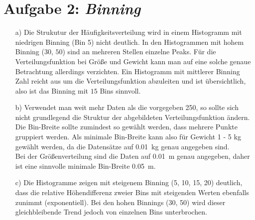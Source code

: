 \section*{Aufgabe 2: \emph{Binning}}
\begin{itemize} 
\item[a)] Die Strukutur der Häufigkeitsverteilung wird in einem Histogramm mit niedrigen 
Binning (Bin 5) nicht deutlich. 
In den Histogrammen mit hohem Binning ($30$, $50$) sind an mehreren Stellen einzelne Peaks.
Für die Verteilungsfunktion bei Größe und Gewicht kann man auf eine solche
genaue Betrachtung allerdings verzichten.
Ein Histogramm mit mittlerer Binning Zahl reicht aus um die Verteilungsfunktion abzuleiten und ist übersichtlich, also ist das Binning mit $15$ Bins sinnvoll.

\item[b)] Verwendet man weit mehr Daten als die vorgegeben 250, so sollte sich nicht grundlegend die
Struktur der abgebildeten Verteilungsfunktion ändern.
Die Bin-Breite sollte zumindest so gewählt werden, dass mehrere Punkte gruppiert werden. Als minimale Bin-Breite kann also für Gewicht 1 - 5 kg gewählt werden, da die Datensätze auf \SI{0.01}{\kilogram} genau angegeben sind.\\
Bei der Größenverteilung sind die Daten
auf \SI{0.01}{\metre} genau angegeben, daher ist eine sinnvolle minimale Bin-Breite \SI{0.05}{\metre}. 

\item[c)]
Die Histogramme zeigen mit steigenem Binning (5, 10, 15, 20) deutlich,
dass die relative Höhendifferenz zweier Bins mit steigenden Werten ebenfalls zunimmt (exponentiell).
Bei den hohen Binnings (30, 50) wird dieser gleichbleibende Trend jedoch von einzelnen Bins unterbrochen.


\end{itemize}
